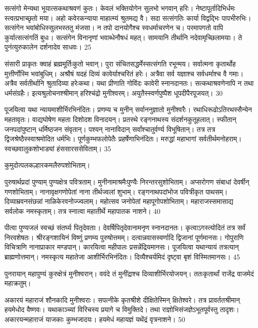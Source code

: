 सत्संगो मेन्यथा भूयात्सकथाश्रवणं कुतः।
केवलं भक्तियोगेन सुलभो भगवान् हरिः।
नेष्टापूर्तादिभिर्धमः स्त्वत्प्रभाच्छृतो मया।
अहो कवेरकन्याया माहात्म्यं श्रुतमद्य वै।
सदा सत्संगतिः कार्या विद्वद्भिः पापभीरुभिः।
सत्संगेन भवांबोधिस्सुलभस्ततु मंजसा।
न तपो दानयोगैश्च स्वधर्माचरणेन च।
परमापगतो वापि कुर्यात्सत्संगतिं बुधः।
सत्संगेन विनानृणां भवाब्धेनौषधं महत्।
सामयानि तीर्थानि नदेवामृच्छिलामयाः।
ते पुनंत्युरुकालेन दर्शनादेव साधवः।
25


संसारी प्राकृतः क्वाहं ब्रह्ममूर्तिःकुतो भवान्।
पुरा संचितसद्धर्मेस्सत्संगति रभून्मय।
सर्वात्मना कृतार्थोह मुत्तीर्णोस्मि भवांबुधिम्।
अश्रौषं यदहं दिव्यं कावेर्याश्चरितं हरेः।
अत्रैवा सर्व यज्ञाश्च सर्वधर्माश्च वै गमाः।
अत्रैव सर्वतीर्थानि श्रुतादिव्या हरेःकथा।
यथा प्रीणाति गोविंदः कावेरी स्नानदानतः।
सत्कथाश्रवणेनापि न तथा धर्मसंग्रहैः।
इत्यश्रुलोचनश्श्रीमान् हरिश्चंद्रो मुनीश्वरम्।
अयुतैस्स्वर्णपुष्पैश धूपदीपैरपूजयत्।
30

पूजयित्वा यथा न्यायमाशीर्भिरभिनंदितः।
प्रणम्य च मुनीन् सर्वाननुज्ञातो मुनीश्वरैः।
रथाधिरूढोऽतिरथस्सैन्येन महतावृतः।
वाद्यघोषेण महता दिशोदश विनादयन्।
प्रतस्थे रङ्गनाथस्य संदर्शनकुतूहलात्।
स्फीतान् जनपदांपुष्टान् धर्मिष्ठजन संवृतान्।
पश्यन् नानाविदान् सर्वांश्चातुर्वर्ण्य विभूषितान्।
तत्र तत्र द्विजश्रेष्ठैस्स्वाश्रमोदित धर्मभिः।
पूर्णकुम्भफलोपेतैः प्रहर्षेणाभिनंदितः।
मरुद्धां महाभागां सर्वतीर्थमनोहराम्।
स्वच्छवालुकशोभाड्यां हंससारससेविताम्।
35

कुमुदोत्पलकल्हारकमलैरुपशोभिताम्।

पुरुषार्थप्रदां पुण्याम् पुण्यक्षेत्र पवित्रताम्।
मुनीनामाश्रमैःपुण्यैः निरन्तरसुशोभिताम्।
अप्सरोगण संबाधां देवर्षीन् गणशोभिताम्।
नानावृक्षगणोपेतां नाना तीर्थज्वलां शुभाम्।
रङ्गनाथपदांभोज पवित्रीकृत पाथसम्।
दिव्याम्रवनसंछन्नां नाळिकेरवनोज्ज्वलाम्।
महोत्सव जनोपेतां महापूगोपशोभिताम्।
महाराजस्समासाद्य सर्वलोक नमस्कृताम्।
तत्र स्नात्वा महातीर्थे महापातक नाशने।
40

पीत्वा पुण्यजलं स्वच्छं संतर्घ्य पितृदेवताः।
देवर्षिपितृदेवानामनृण स्नानदानतः।
कृत्वाऽगस्त्योदितं तत्र सर्वं निरवशेषतः।
श्रीरङ्गशायिनं विष्णुं प्रणम्य पुरुषोत्तमम्।
दत्वान्नवासस्वर्णादि द्विजानां पूर्णमानसः।
गोपुराणि विचित्राणि नानाप्राकार मण्डपान्।
कारयित्वा महीपालः प्रसन्नेंद्रियमानसः।
पूजयित्वा यथान्यायं तत्रत्यान् ब्राह्मणोत्तमान्।
नमस्कृत्य महातेजा आशीर्भिरभिनंदितः।
दिव्यैश्चर्यमिदं दृष्ट्वा बृशं विस्मितमानसः।
45

पुनरायान् महापुण्यं कुरुक्षेत्रं मुनीश्वरान्।
ववंदे तं मुनींद्राश्च दिव्याशीर्भिरयोजयन्।
ततःकृतार्थां राजेंद्र वाजमेदं महाक्रतुम्।

अकारयं महाराजं शौनकादि मुनीश्वराः।
सपत्नीके कृतश्रीशे दीक्षितेस्मिन् क्षितेश्वरे।
तत्र प्रावर्ततश्रीमान् हयमेधोद वैष्णवः।
यथाकाञ्च्यां विरिचस्य प्रयागे च विमुक्तिदे।
तथा राज्ञोभिसंजज्ञेऽभूतपूर्वस्तु तादृशः।
अकारयन्महाराजं याजकाः कुम्भजादयः।
हयमेधं महायज्ञं यथेंद्रं वृत्रनाशने।
50

